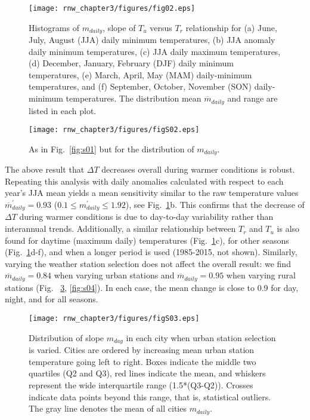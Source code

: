 {\begin{figure}
\texttt{[image: rnw\_chapter3/figures/fig02.eps]} 
\caption{
Histograms of $m_{daily}$, slope of $T_u$ versus $T_r$ relationship  for (a) June, July, August (JJA) daily minimum temperatures, (b) JJA anomaly daily minimum temperatures, (c) JJA daily maximum temperatures, (d) December, January, February (DJF) daily minimum temperatures, (e) March, April, May (MAM) daily-minimum temperatures, and (f) September, October, November (SON) daily-minimum temperatures.  The distribution mean $\overline{m}_{daily}$ and range are listed in each plot.  
}
\label{fig:histogram4}
\end{figure}

\begin{figure}
\texttt{[image: rnw\_chapter3/figures/figS02.eps]}
\caption{As in Fig.~\ref{fig:s01} but for the distribution of $m_{daily}$. %
\label{fig:s02}
}
\end{figure}

The above result that $\Delta T$ decreases overall during warmer conditions is robust. Repeating this analysis with daily anomalies calculated with respect to each year's JJA mean yields a mean sensitivity similar to the raw temperature values $\overline{ m}_{daily}^\prime  = 0.93 $ ($0.1\leq m_{daily}^\prime \leq 1.92$), see Fig.~\ref{fig:histogram4}b. This confirms that the decrease of $\Delta T$ during warmer conditions is due to day-to-day variability rather than interannual trends.
Additionally, a similar relationship between $T_r$ and $T_u$ is also found for daytime (maximum daily) temperatures (Fig.~\ref{fig:histogram4}c), for other seasons (Fig.~\ref{fig:histogram4}d-f), and when a longer period is used (1985-2015, not shown). Similarly, varying the weather station selection does not affect the overall result: we find $\overline{m}_{daily} = 0.84$ when varying urban stations and $\overline{m}_{daily} = 0.95$ when varying rural stations (Fig.~ \ref{fig:s03}, \ref{fig:s04}). In each case, the mean change is close to 0.9 for day, night, and for all seasons. 

\begin{figure}
\texttt{[image: rnw\_chapter3/figures/figS03.eps]}
\caption{Distribution of slope $m_{day}$ in each city when urban station selection is varied. Cities are ordered by increasing mean urban station temperature going left to right. Boxes indicate the middle two quartiles (Q2 and Q3), red lines indicate the mean, and whiskers represent the wide interquartile range (1.5*(Q3-Q2)). Crosses indicate data points beyond this range, that is, statistical outliers. The gray line denotes the mean of all cities $m_{daily}$. }
\label{fig:s03}
\end{figure}

}
